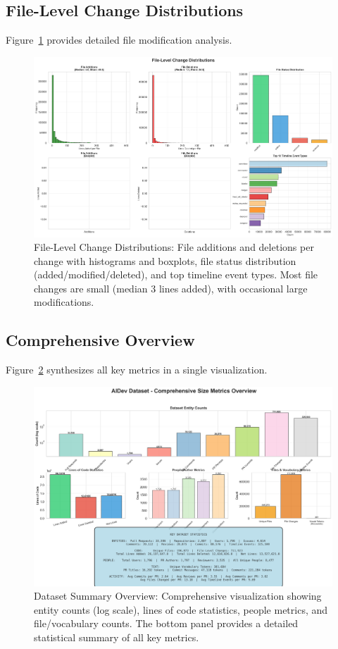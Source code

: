 \documentclass[11pt]{article}
\begin{document}
\subsection{File-Level Change Distributions}

Figure~\ref{fig:file_level} provides detailed file modification analysis.

\begin{figure}[H]
\centering
\includegraphics[width=\textwidth]{figures/file_level_distributions.png}
\caption{File-Level Change Distributions: File additions and deletions per change with histograms and boxplots, file status distribution (added/modified/deleted), and top timeline event types. Most file changes are small (median 3 lines added), with occasional large modifications.}
\label{fig:file_level}
\end{figure}

\subsection{Comprehensive Overview}

Figure~\ref{fig:overview} synthesizes all key metrics in a single visualization.

\begin{figure}[H]
\centering
\includegraphics[width=\textwidth]{figures/dataset_summary_overview.png}
\caption{Dataset Summary Overview: Comprehensive visualization showing entity counts (log scale), lines of code statistics, people metrics, and file/vocabulary counts. The bottom panel provides a detailed statistical summary of all key metrics.}
\label{fig:overview}
\end{figure}
\end{document}
